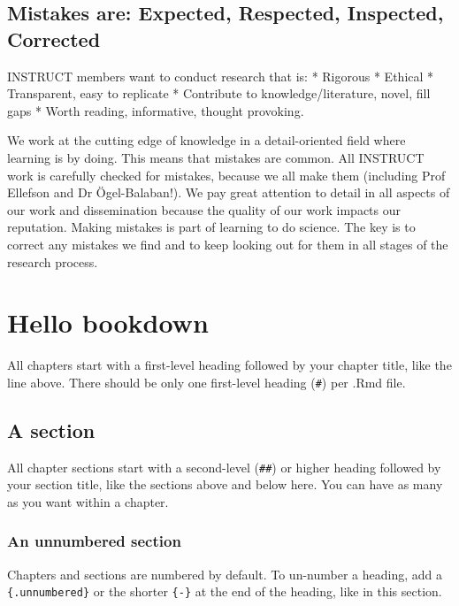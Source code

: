 \documentclass[
]{book}
\theoremstyle{definition}
\theoremstyle{definition}
\theoremstyle{definition}
\theoremstyle{definition}
\theoremstyle{remark}
\begin{document}
\section{Mistakes are: Expected, Respected, Inspected, Corrected}\label{mistakes-are-expected-respected-inspected-corrected}

INSTRUCT members want to conduct research that is:
* Rigorous
* Ethical
* Transparent, easy to replicate
* Contribute to knowledge/literature, novel, fill gaps
* Worth reading, informative, thought provoking.

We work at the cutting edge of knowledge in a detail-oriented field where learning is by doing. This means that mistakes are common. All INSTRUCT work is carefully checked for mistakes, because we all make them (including Prof Ellefson and Dr Ögel-Balaban!). We pay great attention to detail in all aspects of our work and dissemination because the quality of our work impacts our reputation. Making mistakes is part of learning to do science. The key is to correct any mistakes we find and to keep looking out for them in all stages of the research process.

\chapter{Hello bookdown}\label{hello-bookdown}

All chapters start with a first-level heading followed by your chapter title, like the line above. There should be only one first-level heading (\texttt{\#}) per .Rmd file.

\section{A section}\label{a-section}

All chapter sections start with a second-level (\texttt{\#\#}) or higher heading followed by your section title, like the sections above and below here. You can have as many as you want within a chapter.

\subsection*{An unnumbered section}\label{an-unnumbered-section}

Chapters and sections are numbered by default. To un-number a heading, add a \texttt{\{.unnumbered\}} or the shorter \texttt{\{-\}} at the end of the heading, like in this section.
\end{document}
